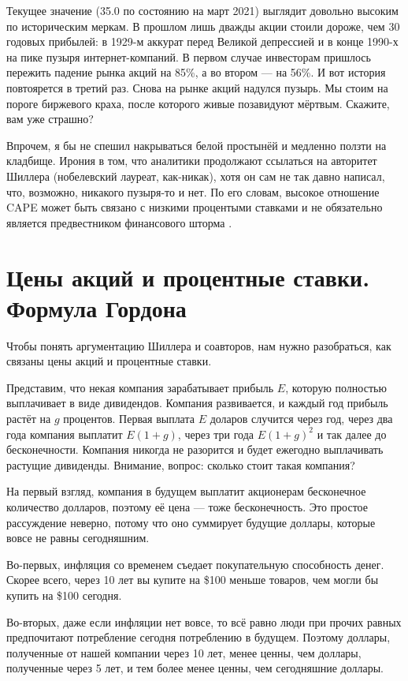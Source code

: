 Текущее значение (35.0 по состоянию на март 2021) выглядит довольно высоким по историческим меркам. В прошлом лишь дважды акции стоили дороже, чем 30 годовых прибылей: в 1929-м аккурат перед Великой депрессией и в конце 1990-х на пике пузыря интернет-компаний. В первом случае инвесторам пришлось пережить падение рынка акций на 85\%, а во втором --- на 56\%. И вот история повтоярется в третий раз. Снова на рынке акций надулся пузырь. Мы стоим на пороге биржевого краха, после которого живые позавидуют мёртвым. Скажите, вам уже страшно?

Впрочем, я бы не спешил накрываться белой простынёй и медленно ползти на кладбище. Ирония в том, что аналитики продолжают ссылаться на авторитет Шиллера (нобелевский лауреат, как-никак), хотя он сам не так давно написал, что, возможно, никакого пузыря-то и нет. По его словам, высокое отношение CAPE может быть связано с низкими процентыми ставками и не обязательно является предвестником финансового шторма \cite{shiller2020cape}.

\section{Цены акций и процентные ставки. Формула Гордона}

Чтобы понять аргументацию Шиллера и соавторов, нам нужно разобраться, как связаны цены акций и процентные ставки.

Представим, что некая компания зарабатывает прибыль $E$, которую полностью выплачивает в виде дивидендов. Компания развивается, и каждый год прибыль растёт на $g$ процентов. Первая выплата $E$ доларов случится через год, через два года компания выплатит $E(1+g)$, через три года $E(1+g)^2$ и так далее до бесконечности. Компания никогда не разорится и будет ежегодно выплачивать  растущие дивиденды. Внимание, вопрос: сколько стоит такая компания?

На первый взгляд, компания в будущем выплатит акционерам бесконечное количество долларов, поэтому её цена --- тоже бесконечность. Это простое рассуждение неверно, потому что оно суммирует будущие доллары, которые вовсе не равны сегодняшним.

Во-первых, инфляция со временем съедает покупательную способность денег. Скорее всего, через 10 лет вы купите на \$100 меньше товаров, чем могли бы купить на \$100 сегодня.

Во-вторых, даже если инфляции нет вовсе, то всё равно люди при прочих равных предпочитают потребление сегодня потреблению в будущем. Поэтому доллары, полученные от нашей компании через 10 лет, менее ценны, чем доллары, полученные через 5 лет, и тем более менее ценны, чем сегодняшние доллары.

